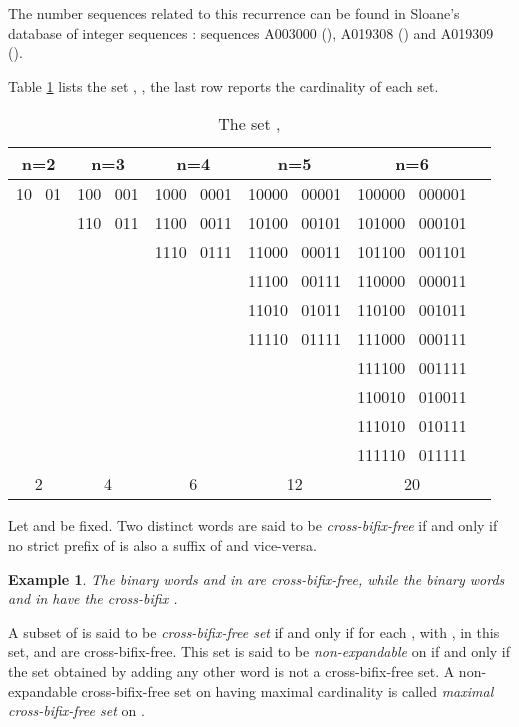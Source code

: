 \documentclass[a4paper,11pt]{article}
\newtheorem{example}{Example}[section]
\begin{document}
The number sequences related to this recurrence can be found in
Sloane's database of integer sequences \cite{12}: sequences
A003000 (), A019308 () and A019309 ().

Table \ref{bfree} lists the set , , the
last row reports the cardinality of each set.

\begin{table}[htb]
\begin{center}
\begin{tabular}{|c|c|c|c|c|c|}
\hline \hline n=2 & n=3 & n=4 & n=5 & n=6\\
\hline

10 \ 01 & 100 \ 001 & 1000 \ 0001 & 10000 \ 00001 & 100000 \ 000001 \\
   & 110 \ 011 & 1100 \ 0011 & 10100 \ 00101 & 101000 \ 000101\\
   &     & 1110 \ 0111 & 11000 \ 00011 & 101100 \ 001101\\
   &     &      & 11100 \ 00111 & 110000 \ 000011\\
   &     &      & 11010 \ 01011 & 110100 \ 001011\\
   &     &      & 11110 \ 01111 & 111000 \ 000111\\
   &     &      &       & 111100 \ 001111\\
   &     &      &       & 110010 \ 010011\\
   &     &      &       & 111010 \ 010111\\
   &     &      &       & 111110 \ 011111\\
\hline
 2 & 4 & 6 & 12 & 20\\
\hline


\end{tabular}
\end{center}
\caption{\label{bfree}The set , }
\end{table}

Let  and  be fixed. Two distinct words  are said to be \emph{cross-bifix-free} if and only if
no strict prefix of  is also a suffix of  and
vice-versa.

\begin{example}\label{esemp}
The binary words  and  in  are
cross-bifix-free, while the binary words  and
 in  have the cross-bifix .
\end{example}

A subset of  is said to be \emph{cross-bifix-free set} if
and only if for each , with , in this set,  and  are
cross-bifix-free. This set is said to be \emph{non-expandable} on
 if and only if the set obtained by adding any other word
is not a cross-bifix-free set. A non-expandable cross-bifix-free
set on  having maximal cardinality is called
\emph{maximal cross-bifix-free set} on .
\end{document}
